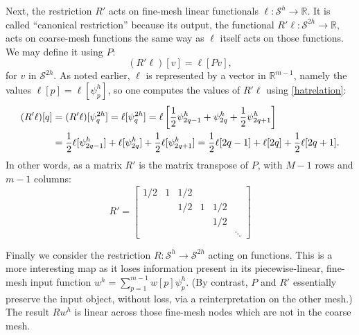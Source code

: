 \documentclass[letterpaper,final,12pt,reqno]{amsart}
\newcommand{\RR}{\mathbb{R}}
\begin{document}
Next, the restriction $R'$ acts on fine-mesh linear functionals $\ell:\mathcal{S}^h \to \RR$.  It is called ``canonical restriction'' \cite{GraeserKornhuber2009} because its output, the functional $R'\ell:\mathcal{S}^{2h}\to \RR$, acts on coarse-mesh functions the same way as $\ell$ itself acts on those functions.  We may define it using $P$:
\begin{equation}
  (R'\ell)[v] = \ell[Pv],  \label{rprimedefinition}
\end{equation}
for $v$ in $\mathcal{S}^{2h}$.  As noted earlier, $\ell$ is represented by a vector in $\RR^{m-1}$, namely the values $\ell[p] = \ell[\psi_p^h]$, so one computes the values of $R'\ell$ using \eqref{hatrelation}:
\begin{align}
  (R'\ell)[q] &= (R'\ell)[\psi_q^{2h}] = \ell[\psi_q^{2h}] = \ell\left[\frac{1}{2} \psi_{2q-1}^h + \psi_{2q}^h + \frac{1}{2} \psi_{2q+1}^h\right]  \label{rprimeformula} \\
      &= \frac{1}{2} \ell[\psi_{2q-1}^h] + \ell[\psi_{2q}^h] + \frac{1}{2} \ell[\psi_{2q+1}^h] = \frac{1}{2} \ell[2q-1] + \ell[2q] + \frac{1}{2} \ell[2q+1].  \notag
\end{align}
In other words, as a matrix $R'$ is the matrix transpose of $P$, with $M-1$ rows and $m-1$ columns:
\begin{equation}
R' = \begin{bmatrix}
1/2 & 1 & 1/2 &   &     & \\
    &   & 1/2 & 1 & 1/2 & \\
    &   &     &   & 1/2 & \\
    &   &     &   &     & \ddots
\end{bmatrix} \label{rprimematrix}
\end{equation}

Finally we consider the restriction $R:\mathcal{S}^h\to\mathcal{S}^{2h}$ acting on functions.  This is a more interesting map as it loses information present in its piecewise-linear, fine-mesh input function $w^h = \sum_{p=1}^{m-1} w[p] \psi_p^{h}$.  (By contrast, $P$ and $R'$ essentially preserve the input object, without loss, via a reinterpretation on the other mesh.)  The result $R w^h$ is linear across those fine-mesh nodes which are not in the coarse mesh.

\newcommand{\Rpr}{R_{\text{pr}}}
\newcommand{\Rin}{R_{\text{in}}}
\newcommand{\Rfw}{R_{\text{fw}}}
\end{document}
